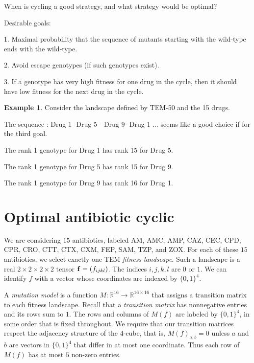 \documentclass[12pt]{amsart}
\theoremstyle{plain}
\theoremstyle{definition}
\newtheorem{example}[theorem]{Example}
\newcommand{\R}{{\mathbb R}}
\begin{document}
{When is cycling a good strategy, and what
strategy would be optimal?



\bigskip



Desirable goals: 

1. Maximal probability
that the sequence of mutants starting with the wild-type
 ends with the wild-type.


2. Avoid escape genotypes (if such genotypes exist).

3. If a genotype has very high fitness for one drug
in the cycle, then it should have low fitness for the next 
drug in the cycle.


\begin{example}
Consider the landscape defined by TEM-50 and the 15 drugs.


The sequence : Drug 1- Drug 5 - Drug 9- Drug 1 ...
seems like a good choice if for the third goal.

The rank 1 genotype for Drug 1 has rank 15 for Drug 5.

The rank 1 genotype for Drug 5 has rank 15 for Drug 9. 

The rank 1 genotype for Drug 9 has rank 16 for Drug 1.
\end{example}




\section{Optimal antibiotic cyclic}

We are considering $15$ antibiotics, labeled
AM, AMC, AMP, CAZ, CEC, CPD, CPR, CRO, CTT, CTX, CXM, FEP, SAM, TZP,
and ZOX. For each of these $15$ antibiotics, we select exactly one TEM 
{\em fitness landscape}.
Such a landscape  is a real $2 {\times} 2 {\times} 2 {\times} 2$ tensor 
${\bf f} = (f_{ijkl})$. The indices $i,j,k,l$ are $0$ or $1$.
We can identify $f$ with a vector whose coordinates
are indexed by $\{0,1\}^4$.

A {\em mutation model} is a function $M : \R^{16} \rightarrow \R^{16 \times 16}$
that assigns a transition matrix to each fitness landscape.
Recall that a {\em transition matrix} has nonnegative entries
and its rows sum to $1$. The rows and columns of
$M(f)$ are labeled by $\{0,1\}^4$, in some order
that is fixed throughout.
We require that our transition matrices respect the adjacency structure
of the $4$-cube, that is, $M(f)_{a,b} = 0$
unless $a$ and $b$ are vectors in $\{0,1\}^4$ that differ in at most one coordinate.
Thus each row of $M(f)$ has at most $5$ non-zero entries.

}
\end{document}
